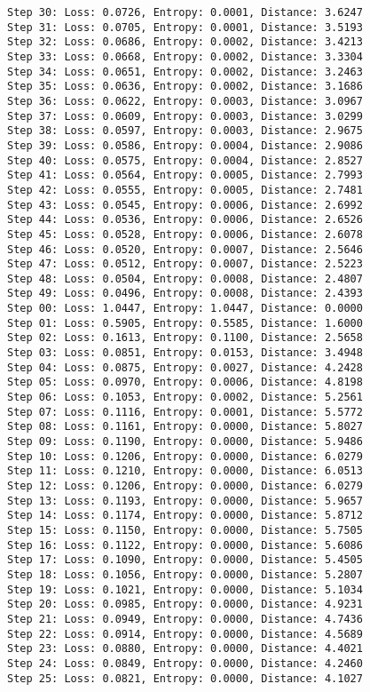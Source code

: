 \documentclass[11pt]{article}
\begin{document}
\begin{Verbatim}[commandchars=\\\{\}]
Step 30: Loss: 0.0726, Entropy: 0.0001, Distance: 3.6247
Step 31: Loss: 0.0705, Entropy: 0.0001, Distance: 3.5193
Step 32: Loss: 0.0686, Entropy: 0.0002, Distance: 3.4213
Step 33: Loss: 0.0668, Entropy: 0.0002, Distance: 3.3304
Step 34: Loss: 0.0651, Entropy: 0.0002, Distance: 3.2463
Step 35: Loss: 0.0636, Entropy: 0.0002, Distance: 3.1686
Step 36: Loss: 0.0622, Entropy: 0.0003, Distance: 3.0967
Step 37: Loss: 0.0609, Entropy: 0.0003, Distance: 3.0299
Step 38: Loss: 0.0597, Entropy: 0.0003, Distance: 2.9675
Step 39: Loss: 0.0586, Entropy: 0.0004, Distance: 2.9086
Step 40: Loss: 0.0575, Entropy: 0.0004, Distance: 2.8527
Step 41: Loss: 0.0564, Entropy: 0.0005, Distance: 2.7993
Step 42: Loss: 0.0555, Entropy: 0.0005, Distance: 2.7481
Step 43: Loss: 0.0545, Entropy: 0.0006, Distance: 2.6992
Step 44: Loss: 0.0536, Entropy: 0.0006, Distance: 2.6526
Step 45: Loss: 0.0528, Entropy: 0.0006, Distance: 2.6078
Step 46: Loss: 0.0520, Entropy: 0.0007, Distance: 2.5646
Step 47: Loss: 0.0512, Entropy: 0.0007, Distance: 2.5223
Step 48: Loss: 0.0504, Entropy: 0.0008, Distance: 2.4807
Step 49: Loss: 0.0496, Entropy: 0.0008, Distance: 2.4393
Step 00: Loss: 1.0447, Entropy: 1.0447, Distance: 0.0000
Step 01: Loss: 0.5905, Entropy: 0.5585, Distance: 1.6000
Step 02: Loss: 0.1613, Entropy: 0.1100, Distance: 2.5658
Step 03: Loss: 0.0851, Entropy: 0.0153, Distance: 3.4948
Step 04: Loss: 0.0875, Entropy: 0.0027, Distance: 4.2428
Step 05: Loss: 0.0970, Entropy: 0.0006, Distance: 4.8198
Step 06: Loss: 0.1053, Entropy: 0.0002, Distance: 5.2561
Step 07: Loss: 0.1116, Entropy: 0.0001, Distance: 5.5772
Step 08: Loss: 0.1161, Entropy: 0.0000, Distance: 5.8027
Step 09: Loss: 0.1190, Entropy: 0.0000, Distance: 5.9486
Step 10: Loss: 0.1206, Entropy: 0.0000, Distance: 6.0279
Step 11: Loss: 0.1210, Entropy: 0.0000, Distance: 6.0513
Step 12: Loss: 0.1206, Entropy: 0.0000, Distance: 6.0279
Step 13: Loss: 0.1193, Entropy: 0.0000, Distance: 5.9657
Step 14: Loss: 0.1174, Entropy: 0.0000, Distance: 5.8712
Step 15: Loss: 0.1150, Entropy: 0.0000, Distance: 5.7505
Step 16: Loss: 0.1122, Entropy: 0.0000, Distance: 5.6086
Step 17: Loss: 0.1090, Entropy: 0.0000, Distance: 5.4505
Step 18: Loss: 0.1056, Entropy: 0.0000, Distance: 5.2807
Step 19: Loss: 0.1021, Entropy: 0.0000, Distance: 5.1034
Step 20: Loss: 0.0985, Entropy: 0.0000, Distance: 4.9231
Step 21: Loss: 0.0949, Entropy: 0.0000, Distance: 4.7436
Step 22: Loss: 0.0914, Entropy: 0.0000, Distance: 4.5689
Step 23: Loss: 0.0880, Entropy: 0.0000, Distance: 4.4021
Step 24: Loss: 0.0849, Entropy: 0.0000, Distance: 4.2460
Step 25: Loss: 0.0821, Entropy: 0.0000, Distance: 4.1027

\end{Verbatim}
\end{document}

